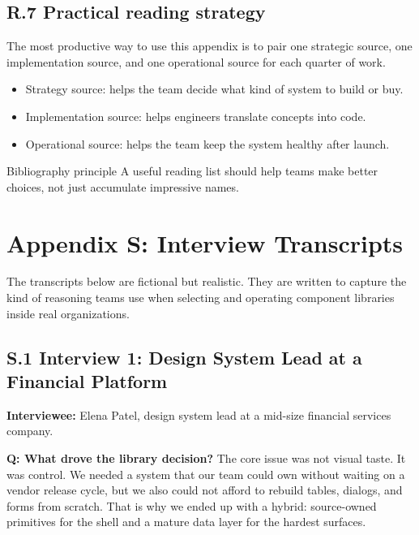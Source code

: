 \subsection*{R.7 Practical reading strategy}
The most productive way to use this appendix is to pair one strategic source, one implementation source, and one operational source for each quarter of work.

\begin{itemize}[leftmargin=*, itemsep=0.35em]
  \item Strategy source: helps the team decide what kind of system to build or buy.
  \item Implementation source: helps engineers translate concepts into code.
  \item Operational source: helps the team keep the system healthy after launch.
\end{itemize}

\begin{highlightbox}{Bibliography principle}
A useful reading list should help teams make better choices, not just accumulate impressive names.
\end{highlightbox}

\clearpage
{}
\section*{Appendix S: Interview Transcripts}

The transcripts below are fictional but realistic. They are written to capture the kind of reasoning teams use when selecting and operating component libraries inside real organizations.

\subsection*{S.1 Interview 1: Design System Lead at a Financial Platform}
\textbf{Interviewee:} Elena Patel, design system lead at a mid-size financial services company.

\textbf{Q: What drove the library decision?}
The core issue was not visual taste. It was control. We needed a system that our team could own without waiting on a vendor release cycle, but we also could not afford to rebuild tables, dialogs, and forms from scratch. That is why we ended up with a hybrid: source-owned primitives for the shell and a mature data layer for the hardest surfaces.

